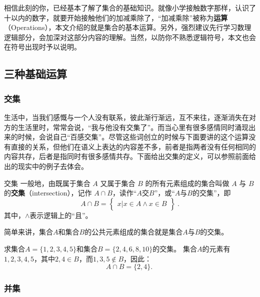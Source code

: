 
\begin{issues}
\issueDraft
\end{issues}
相信此刻的你，已经基本了解了集合的基础知识。就像小学接触数字那样，认识了十以内的数字，就要开始接触他们的加减乘除了，“加减乘除”被称为\textbf{运算}（Operations），本文介绍的就是集合的基本运算。另外，强烈建议先行学习数理逻辑部分，会加深对这部分内容的理解。当然，以防你不熟悉逻辑符号，本文也会在符号出现时予以说明。

\subsection{三种基础运算}

\subsubsection{交集}

生活中，当我们感慨与一个人没有联系，彼此渐行渐远，互不来往，逐渐消失在对方的生活里时，常常会说，“我与他没有交集了”。而当心里有很多感情同时涌现出来的时候，会说自己“百感交集”。尽管这些词创立的时候与下面要讲的这个运算没有直接的关系，但他们在语义上表达的内容差不多，前者是指两者没有任何相同的内容共存，后者是指同时有很多感情共存。下面给出交集的定义，可以参照前面给出的现实中的例子去体会。

\begin{definition}{交集}
一般地，由既属于集合 $A$ 又属于集合 $B$ 的所有元素组成的集合叫做 $A$ 与 $B$ 的\textbf{交集}（intersection），记作 $A \cap B$，读作“$A$交$B$”，或“$A$与$B$的交集”，即
\begin{equation}
A\cap B = \begin{Bmatrix} x|x\in A\land x\in B \end{Bmatrix}~.
\end{equation}
其中，$\land$表示逻辑上的“且”。
\end{definition}

简单来讲，集合$A$和集合$B$的公共元素组成的集合就是集合$A$与$B$的交集。
\begin{example}{求集合$A=\{1,2,3,4,5\}$和集合$B=\{2,4,6,8,10\}$的交集。}
集合$A$的元素有$1,2,3,4,5$，其中$2,4\in B$，而$1,3,5\notin B$，因此：
$$
A\cap B=\{2,4\}.~
$$
\end{example}
\subsubsection{并集}

